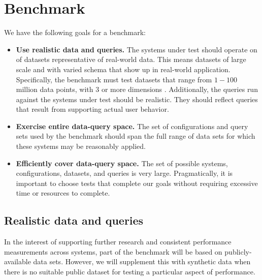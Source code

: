 \documentclass[journal]{vgtc}                %
\begin{document}
{



\section{Benchmark}


We have the following goals for a benchmark:

\begin{itemize}
	\item \textbf{Use realistic data and queries.} The systems under test
		should operate on of datasets representative of real-world data. This
		means datasets of large scale and with varied schema that show up in
		real-world application. Specifically, the benchmark must test datasets
		that range from $1-100$ million data points, with $3$ or more dimensions
		\cite{...}.  Additionally, the queries run against the systems
		under test should be realistic.  They should reflect queries that
		result from supporting actual user behavior.

	\item \textbf{Exercise entire data-query space.} The set of configurations
		and query sets used by the benchmark should span the full range of data
		sets for which these systems may be reasonably applied. 
		
	\item \textbf{Efficiently cover data-query space.} The set of possible
		systems, configurations, datasets, and queries is very large.
		Pragmatically, it is important to choose tests that complete our goals
		without requiring excessive time or resources to complete.

\end{itemize}

\subsection{Realistic data and queries}

In the interest of supporting further research and consistent performance measurements across systems, part of the benchmark will be based on publicly-available data sets. However, we will supplement this with synthetic data when there is no suitable public dataset for testing a particular aspect of performance.

}
\end{document}
